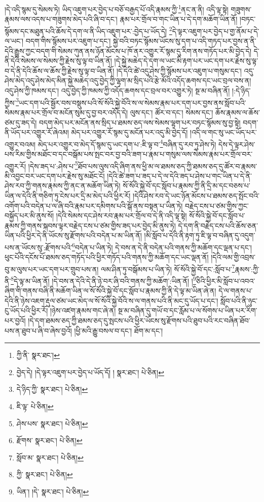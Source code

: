 །དེ་འདི་སྙམ་དུ་སེམས་ཏེ། ཡིད་འཇུག་པར་བྱེད་པ་བཅོ་བརྒྱད་པོ་འདི་རྣམས་ཀྱི་\footnote{ཀྱི་ནི་  སྣར་ཐང་། }ནང་ན་ནི། འདི་ལྟ་སྟེ། གཟུགས་རྣམས་ལས་འདས་པ་གཟུགས་མེད་པའི་ཞི་བ་དང་། རྣམ་པར་གྲོལ་བ་གང་ཡིན་པ་དེ་དག་མཆོག་ཡིན་ནོ། །བཏང་སྙོམས་དང་མཐུན་པའི་ཆོས་དེ་དག་ལ་ནི་ཡིད་འཇུག་པར་:བྱེད་པ་ཡོད་དེ། \footnote{བྱེད་དེ། །དེ་ལྟར་འཇུག་པར་བྱེད་པ་ཡོད་དོ། །   སྣར་ཐང་།  པེ་ཅིན། }དེ་ལྟར་འཇུག་པར་བྱེད་པ་གྱ་ནོམ་པ་དེ་ལ་ཡང་། བདག་གིས་སྙོམས་པར་འཇུག་པ་དང་། སྐྱེ་བའི་བཏང་སྙོམས་ཡོངས་སུ་དག་པ་འདི་གཏད་པར་བྱས་ན་ནི་དེའི་རྒྱུས་ཀྱང་བདག་གི་སེམས་ཀུན་ནས་ཉོན་མོངས་པ་ཁོ་ནར་འགྱུར་རོ་སྙམ་དུ་རིག་ནས་གཏོད་པར་མི་བྱེད་དེ། དེ་ནི་དེའི་སེམས་ལ་སེམས་ཀྱི་རྗེས་སུ་ལྟ་བ་ཡིན་ནོ། །དེ་སྐྱེ་མཆེད་དེ་དག་ལ་ཡང་མི་རྟག་པར་ཡང་དག་པར་རྗེས་སུ་ལྟ་བ་དེ་ནི་དེའི་ཆོས་ལ་ཆོས་ཀྱི་རྗེས་སུ་ལྟ་བ་ཡིན་ནོ། །དེ་དེའི་ཚེ་འདུ་ཤེས་ཀྱི་སྙོམས་པར་འཇུག་པ་གསུམ་དང་། འདུ་ཤེས་མེད་འདུ་ཤེས་མེད་མིན་སྐྱེ་མཆེད་འདུ་བྱེད་ཀྱི་ལྷག་མ་སྲིད་པའི་རྩེ་མོའི་འདོད་ཆགས་དང་ཡང་བྲལ་བས་ན། འདུ་ཤེས་ཀྱི་ཁམས་དང་། འདུ་བྱེད་ཀྱི་ཁམས་ཀྱི་འདོད་ཆགས་དང་བྲལ་བར་འགྱུར་ཏེ། སྔ་མ་བཞིན་ནོ། །:དེ་ཉིད་ཀྱིས་\footnote{དེ་ཉིད་ཀྱི་  སྣར་ཐང་།  པེ་ཅིན། }ཡང་དག་པའི་སྦྱོར་བས་བསྡུས་པའི་སོ་སོའི་སྐྱེ་བོའི་ས་ལ་སེམས་རྣམ་པར་དག་པར་བྱས་ནས་སློབ་པའི་སེམས་རྣམ་པར་གྲོལ་བ་མངོན་སུམ་དུ་བྱ་བར་འདོད་དེ། ལུས་དང་། ཚོར་བ་དང་། སེམས་དང་། ཆོས་རྣམས་ལ་ཆོས་ཙམ་དུ་ཟད་དེ། བདག་མེད་པར་མངོན་ནས་སྲིད་པ་ཐམས་ཅད་ལས་སེམས་ལྷག་པར་བཏང་སྙོམས་སུ་བྱ་སྟེ། བདག་ནི་ཡོད་པར་འགྱུར་རོ་ཞེའམ། མེད་པར་འགྱུར་རོ་སྙམ་དུ་མངོན་པར་འདུ་མི་བྱེད་དོ། །འདི་ལ་གང་སུ་ཡང་ཡོད་པར་འགྱུར་བའམ། མེད་པར་འགྱུར་བ་མེད་དོ་སྙམ་དུ་ཡང་དག་པ་:ཇི་ལྟ་བ་\footnote{ཇི་ལྟ་  པེ་ཅིན། }བཞིན་དུ་རབ་ཏུ་ཤེས་ཏེ། དེས་དེ་ལྟར་ཤེས་པས་རིམ་གྱིས་མཐོང་བ་དང་བསྒོམ་པས་སྤང་བར་བྱ་བའི་ཟག་པ་རྣམ་པ་གསུམ་ལས་སེམས་རྣམ་པར་གྲོལ་བར་འགྱུར་རོ། །དེས་ཟད་པ་:ཤེས་པ་\footnote{ཤེས་པས་  སྣར་ཐང་།  པེ་ཅིན། }ཐོབ་པས་ལུས་འདི་ཞིག་ནས་ཕྱི་མ་ལ་ཐམས་ཅད་ཀྱི་ཐམས་ཅད་དུ་ཚོར་བ་རྣམས་མི་འབྱང་བར་ཡང་དག་པར་རྗེས་སུ་མཐོང་ངོ། །དེའི་ཚེ་ཟག་པ་ཟད་པ་དེ་ལ་དེའི་ཟད་པ་ཤེས་པ་གང་ཡིན་པ་དེ་ནི་ཤེས་རབ་ཀྱི་གནས་རྣམས་ཀྱི་ནང་ན་མཆོག་ཡིན་ཏེ། སོ་སོའི་སྐྱེ་བོ་དང་སློབ་པ་རྣམས་ཀྱི་ནི་དྲི་མ་དང་བཅས་པ་ཡིན་ལ་དེའི་ནི་གཅིག་ཏུ་ངེས་པར་དྲི་མ་མེད་པའི་ཕྱིར་རོ། །དེའི་ཤེས་རབ་དེ་ཡང་ཉོན་མོངས་པ་ཐམས་ཅད་སྤོང་བའི་འགོག་པའི་བདེན་པ་ལ་ཞི་བའི་རྣམ་པར་དམིགས་པའི་སྒོ་ནས་བསྟན་པ་ཡིན་ཏེ། བརྗེད་ངས་པ་ཙམ་གྱིས་ཀྱང་བསྐྱོད་པར་མི་ནུས་སོ། །དེའི་སེམས་དང་ཤེས་རབ་རྣམ་པར་གྲོལ་བ་དེ་ནི་འདི་ལྟ་སྟེ། སོ་སོའི་སྐྱེ་བོ་དང་སློབ་པ་རྣམས་ཀྱི་གནས་སྐབས་ལྟར་བརྗེད་ངས་པ་ཙམ་གྱིས་ཟད་པར་བྱེད་མི་ནུས་ཏེ། དེ་དག་ནི་བརྗེད་ངས་པའི་ཆོས་ཅན་ཡིན་པའི་ཕྱིར་དེ་ནི་ཡོངས་སུ་རྫོགས་པའི་བདེན་པ་མ་ཡིན་ནོ། །མི་སློབ་པ་དེའི་ནི་རྟག་ཏུ་ཇི་ལྟ་བ་བཞིན་དུ་འདུག་པས་ན་ཡོངས་སུ་:རྫོགས་པའི་\footnote{རྫོགས་  སྣར་ཐང་།  པེ་ཅིན། }བདེན་པ་ཡིན་ཏེ། དེ་བས་ན་དེ་ནི་བདེན་པའི་གནས་ཀྱི་མཆོག་དང་ལྡན་པ་དང་། ཕུང་པོའི་དངོས་པོ་ཐམས་ཅད་གཏོད་པའི་ཕྱིར་གཏོད་པའི་གནས་ཀྱི་མཆོག་དང་ཡང་ལྡན་ནོ། །དེའི་ལམ་གྱི་འབྲས་བུ་མ་ལུས་པར་ཡང་དག་པར་གྲུབ་པས་ན། ལམ་ཤིན་ཏུ་བསྒོམས་པ་ཡིན་ཏེ། སོ་སོའི་སྐྱེ་བོ་དང་:སློབ་པ་\footnote{སློབ་མ་  སྣར་ཐང་།  པེ་ཅིན། }རྣམས་:ཀྱི་ནི་\footnote{ཀྱི་  སྣར་ཐང་།  པེ་ཅིན། }དེ་ལྟ་མ་ཡིན་ནོ། །དེ་བས་ན་དེའི་དེ་ནི་ཉེ་བར་ཞི་བའི་གནས་ཀྱི་མཆོག་:ཡིན་ནོ། །\footnote{ཡིན་། །དེ་  སྣར་ཐང་།  པེ་ཅིན། }ཅིའི་ཕྱིར་མི་སློབ་པ་འབའ་ཞིག་གི་གནས་བཞི་ནི་མཆོག་ཡིན་ལ་སོ་སོའི་སྐྱེ་བོ་དང་སློབ་པ་རྣམས་ཀྱི་ནི་དེ་ལྟ་མ་ཡིན་ཞེ་ན། དེ་ལ་གནས་པ་དེའི་ནི་ཉེས་འཇག་རྡུལ་ཙམ་ཡང་མེད་ལ་སོ་སོའི་སྐྱེ་བོའི་ས་ལ་གནས་པའི་ནི་མང་དུ་ཡོད་པ་དང་། སློབ་པའི་ནི་ཉུང་ངུ་ཡོད་པའི་ཕྱིར་རོ། །ཉེས་འཛག་རྣམས་གང་ཞེ་ན། སྔ་མ་བཞིན་དུ་གཡོ་བ་དང་རློམ་པ་ལ་སོགས་པ་ཡིན་པར་རིག་པར་བྱའོ། །དེ་དག་ཐམས་ཅད་ཀྱི་ཐམས་ཅད་དུ་སྤངས་པའི་ཕྱིར་ཡོངས་སུ་རྫོགས་པའི་ཐུབ་པའི་རང་བཞིན་ཐོབ་པས་ན་ཐུབ་པ་ཞི་བ་ཞེས་བྱའོ། །ཕྱི་མའི་རྒྱུ་བསལ་བ་དང་། ཐོག་མ་དང་། 
